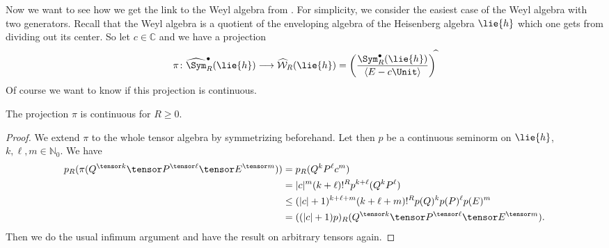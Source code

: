 Now we want to see how we get the link to the Weyl algebra from
\cite{waldmann:2014a}. For simplicity, we consider the easiest case of
the Weyl algebra with two generators. Recall that the Weyl
algebra is a quotient of the enveloping algebra of the Heisenberg
algebra $\lie{h}$ which one gets from dividing out its center. So let
$c \in \mathbb{C}$ and we have a projection
\begin{equation}
    \label{Nilpot:WeylProjection}
    \pi \colon
    \widehat{\Sym}_R^\bullet(\lie{h})
    \longrightarrow
    \widehat{\mathcal{W}}_R(\lie{h})
    =
     \left(
    	\frac{\Sym_R^\bullet(\lie{h})}
    	{\langle E - c \Unit \rangle}
    \right)^{\widehat{} }
\end{equation}
Of course we want to know if this projection is continuous.
\begin{proposition}
    \label{proposition:ProjectionWeylContinuous}%
    The projection $\pi$ is continuous for $R \geq 0$.
\end{proposition}
\begin{proof}
    We extend $\pi$ to the whole tensor algebra by symmetrizing
    beforehand. Let then $p$ be a continuous seminorm on $\lie{h}$, $k,
    \ell, m \in \mathbb{N}_0$. We have
    \begin{align*}
        p_R(\pi (
        	Q^{\tensor k} \tensor
        	P^{\tensor \ell} \tensor
        	E^{\tensor m}
        ) )
        & =
        p_R( Q^k P^{\ell} c^m )
        \\
        & =
        |c|^m (k + \ell)!^R
        p^{k + \ell}(Q^k P^{\ell})
        \\
        & \leq
        (|c| + 1)^{k + \ell + m}
        (k + \ell + m)!^R
        p(Q)^k p(P)^{\ell} p(E)^m
        \\
        & =
        ((|c| + 1) p)_R
        (Q^{\tensor k} \tensor
        P^{\tensor \ell} \tensor
        E^{\tensor m}).
    \end{align*}
    Then we do the usual infimum argument and have the result on
    arbitrary tensors again.
\end{proof}



